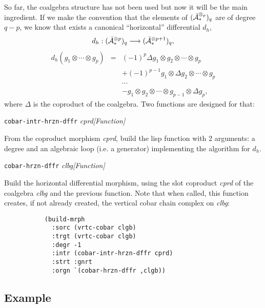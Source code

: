 So far, the coalgebra structure has not been used
but now it will be the main ingredient.
If we  make the convention that the elements of
$({\bar{\cal A}}_*^{\otimes_p})_q$ are of degree $q-p$,
we know that exists a canonical ``horizontal''  differential $d_h$,
$$d_h:({\bar{\cal A}}_*^{\otimes p})_q \longrightarrow ({\bar{\cal A}}_*^{\otimes {p+1}})_q,$$
\begin{eqnarray*}
d_h( g_1 \otimes \cdots \otimes g_p)& = & (-1)^p \Delta g_1 \otimes g_2 \otimes  \cdots \otimes g_p \\
                    & & + (-1)^{p-1} g_1 \otimes \Delta g_2 \otimes \cdots \otimes g_p \\
                    & & \cdots  \\
                    & & - g_1 \otimes g_2 \otimes \cdots \otimes g_{p-1} \otimes \Delta g_p,
\end{eqnarray*}
where $\Delta$ is the coproduct of the coalgebra. Two functions are designed for that:
\vskip 0.45cm
{\parindent=0mm
{\leftskip=5mm
{\tt cobar-intr-hrzn-dffr} {\em cprd}\hfill {\em [Function]} \par}
{\leftskip=15mm
From the coproduct morphism {\em cprd}, build the lisp function with 2 arguments:
a degree and an algebraic loop (i.e. a generator) implementing the algorithm for $d_h$. \par}
{\leftskip=5mm
{\tt cobar-hrzn-dffr} {\em clbg}\hfill {\em [Function]} \par}
{\leftskip=15mm
Build the horizontal differential morphism, using the slot co\-pro\-duct {\em cprd} of
the coalgebra {\em clbg} and the previous function.
Note that when called, this function creates, if not already created,
the vertical cobar chain complex on {\em clbg}:
{\footnotesize\begin{verbatim}
           (build-mrph
             :sorc (vrtc-cobar clgb)
             :trgt (vrtc-cobar clgb)
             :degr -1
             :intr (cobar-intr-hrzn-dffr cprd)
             :strt :gnrt
             :orgn `(cobar-hrzn-dffr ,clgb))
\end{verbatim}}
\par}}

\subsection* {Example}


